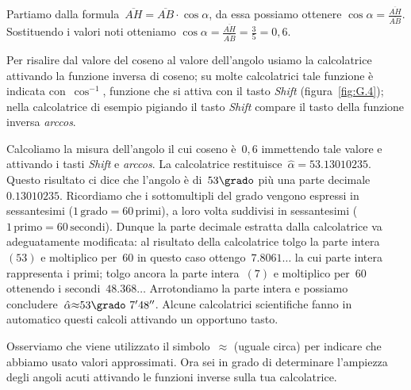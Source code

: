\begin{soluzione}
 Partiamo dalla formula~$\overline{AH}=\overline{AB}\cdot \cos \alpha$, da essa 
possiamo ottenere
$\cos \alpha=\frac{\overline{AH}}{\overline{AB}}$. Sostituendo i valori noti 
otteniamo
$\cos \alpha=\frac{\overline{AH}}{\overline{AB}}=\frac{3}{5}=0,6$.

Per risalire dal valore del coseno al valore dell'angolo usiamo la calcolatrice 
attivando la funzione inversa di coseno; su molte calcolatrici
tale funzione è indicata con~$\cos^{-1}$, funzione che si attiva con il tasto 
\emph{Shift} (figura~\ref{fig:G.4}); nella calcolatrice
di esempio pigiando il tasto \emph{Shift} compare il tasto della funzione 
inversa \emph{arccos}.

Calcoliamo la misura dell'angolo il cui coseno è~$0,6$ immettendo tale valore e 
attivando i tasti \emph{Shift} e \emph{arccos}.
La calcolatrice restituisce~${\hat{\alpha}}= 53.13010235$.
Questo risultato ci dice che l'angolo è di~$53\grado$ più una parte 
decimale~$0.13010235$.
Ricordiamo che i sottomultipli del grado vengono espressi in sessantesimi ($1\, 
\text{grado}=60\, \text{primi}$),
a loro volta suddivisi in sessantesimi ($1\, \text{primo}=60\, \text{secondi}$).
Dunque la parte decimale estratta dalla calcolatrice va adeguatamente 
modificata:
al risultato della calcolatrice tolgo la parte intera~$(53)$ e moltiplico 
per~$60$ in questo caso ottengo~$7.8061\ldots$ la cui parte
intera rappresenta i primi; tolgo ancora la parte intera~$(7)$ e moltiplico 
per~$60$ ottenendo i secondi~$48.368\ldots$
Arrotondiamo la parte intera e possiamo 
concludere~$\hat{\alpha}{\approx}53\grado~7'48''$.
Alcune calcolatrici scientifiche fanno in automatico questi calcoli attivando un 
opportuno tasto.

Osserviamo che viene utilizzato il simbolo~${\approx}$ (uguale circa) per 
indicare che abbiamo usato valori approssimati.
Ora sei in grado di determinare l'ampiezza degli angoli acuti attivando le 
funzioni inverse sulla tua calcolatrice.
\end{soluzione}

